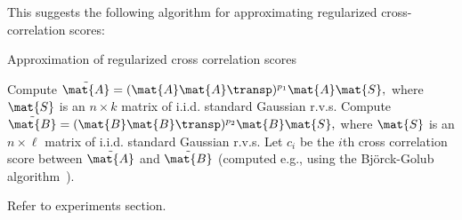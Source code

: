 This suggests the following algorithm for approximating regularized
cross-correlation scores:

\begin{algorithm}

 \caption{Approximation of regularized cross correlation scores}
 \label{ch5:alg:cca-approx}
 \algrenewcommand{}
 \algrenewcommand{}
 \begin{algorithmic}[1]
  \Statex
  
 \State Compute $\tilde{\mat{A}} = (\mat{A} \mat{A}\transp)^{p_1} \mat{A}
\mat{S},$ where $\mat{S}$ is an $n \times k$ matrix of i.i.d. standard Gaussian
r.v.s. 
 \State Compute $\tilde{\mat{B}} = (\mat{B} \mat{B}\transp)^{p_2} \mat{B}
\mat{S},$ where $\mat{S}$ is an $n \times \ell$ matrix of i.i.d. standard
Gaussian r.v.s. 
 \State Let $c_i$ be the $i$th cross correlation score between $\tilde{\mat{A}}$
and $\tilde{\mat{B}}$ (computed e.g., using the Bj\"orck-Golub
algorithm~).
  \end{algorithmic}
\end{algorithm}

Refer to experiments section.

%
%
